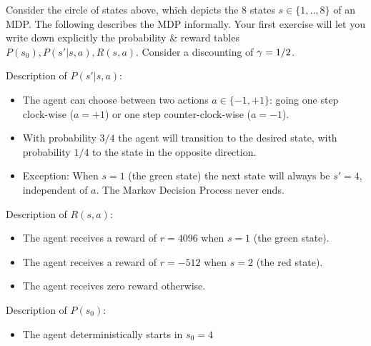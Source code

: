 
Consider the circle of states above, which depicts the 8 states $s\in\{1,..,8\}$ of an
MDP. The following describes the MDP informally. Your first exercise will let you write down explicitly the probability \& reward tables $P(s_0), P(s'|s,a), R(s,a)$. Consider a discounting of $\gamma=1/2$.

Description of $P(s'|s,a)$:\NewParNoBreak
\begin{itemize}
\item The agent can choose between two actions $a\in\{-1,+1\}$: going one step clock-wise ($a=+1$) or one step counter-clock-wise ($a=-1$).
\item With probability $3/4$ the agent will transition to the desired state,
  with probability $1/4$ to the state in the opposite direction.
\item Exception: When $s=1$ (the green state) the next state will always be
$s'=4$, independent of $a$. The Markov Decision Process never ends.
\end{itemize}

Description of $R(s,a)$:\NewParNoBreak
\begin{itemize}
\item The agent receives a reward of $r=4096$ when $s=1$ (the green state).
\item The agent receives a reward of $r=-512$ when $s=2$ (the red state).
\item The agent receives zero reward otherwise.
\end{itemize}

Description of $P(s_0)$:\NewParNoBreak
\begin{itemize}
\item The agent deterministically starts in $s_0=4$
\end{itemize}

